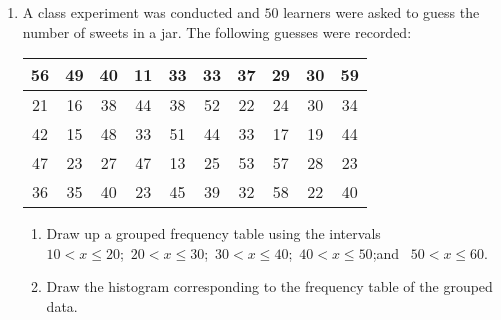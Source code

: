 \begin{exercises}{}{
    \begin{enumerate}[itemsep=5pt, label=\textbf{\arabic*}. ]
    \item  A class experiment was conducted and $50$ learners were asked to
      guess the number of sweets in a jar. The following guesses were
      recorded:
      \\
      \begin{center}
        \begin{tabular}{|c|c|c|c|c|c|c|c|c|c|} \hline
          56 & 49 & 40 & 11 & 33 & 33 & 37 & 29 & 30 & 59 \\ \hline
          21 & 16 & 38 & 44 & 38 & 52 & 22 & 24 & 30 & 34 \\\hline
          42 & 15 & 48 & 33 & 51 & 44 & 33 & 17 & 19 & 44 \\\hline
          47 & 23 & 27 & 47 & 13 & 25 & 53 & 57 & 28 & 23 \\\hline
          36 & 35 & 40 & 23 & 45 & 39 & 32 & 58 & 22 & 40 \\\hline
        \end{tabular}
      \end{center}
      \begin{enumerate}[noitemsep, label=\textbf{(\alph*)} ]
      \item
        Draw up a grouped frequency table using the intervals\\
        $10 < x \le 20$;\ $20 < x \le 30$;\ $30 < x \le 40$;\ 
        $40 < x \le 50$;and \ $50 < x \le 60$.
      \item Draw the histogram corresponding to the frequency table of the
        grouped data.
      \end{enumerate}
    \end{enumerate}
}
\end{exercises}


